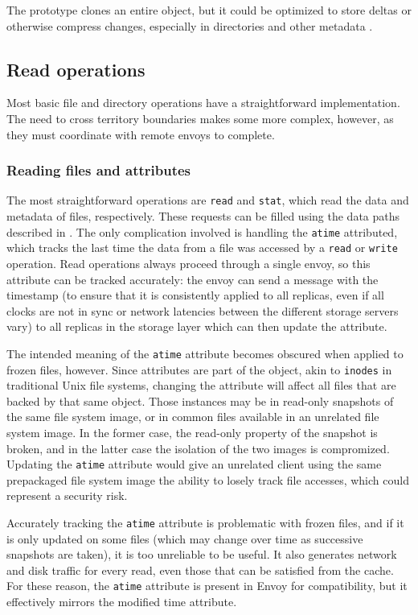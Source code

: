 The prototype clones an entire object, but it could be optimized to store deltas or otherwise compress changes, especially in directories and other metadata \cite{soules}.

\subsection{Read operations}

Most basic file and directory operations have a straightforward implementation. The need to cross territory boundaries makes some more complex, however, as they must coordinate with remote envoys to complete.

\subsubsection{Reading files and attributes}

The most straightforward operations are \texttt{read} and \texttt{stat}, which read the data and metadata of files, respectively. These requests can be filled using the data paths described in . The only complication involved is handling the \texttt{atime} attributed, which tracks the last time the data from a file was accessed by a \texttt{read} or \texttt{write} operation. Read operations always proceed through a single envoy, so this attribute can be tracked accurately: the envoy can send a message with the timestamp (to ensure that it is consistently applied to all replicas, even if all clocks are not in sync or network latencies between the different storage servers vary) to all replicas in the storage layer which can then update the attribute.

The intended meaning of the \texttt{atime} attribute becomes obscured when applied to frozen files, however. Since attributes are part of the object, akin to \texttt{inodes} in traditional Unix file systems, changing the attribute will affect all files that are backed by that same object. Those instances may be in read-only snapshots of the same file system image, or in common files available in an unrelated file system image. In the former case, the read-only property of the snapshot is broken, and in the latter case the isolation of the two images is compromized. Updating the \texttt{atime} attribute would give an unrelated client using the same prepackaged file system image the ability to losely track file accesses, which could represent a security risk.

Accurately tracking the \texttt{atime} attribute is problematic with frozen files, and if it is only updated on some files (which may change over time as successive snapshots are taken), it is too unreliable to be useful. It also generates network and disk traffic for every read, even those that can be satisfied from the cache. For these reason, the \texttt{atime} attribute is present in Envoy for compatibility, but it effectively mirrors the modified time attribute.

